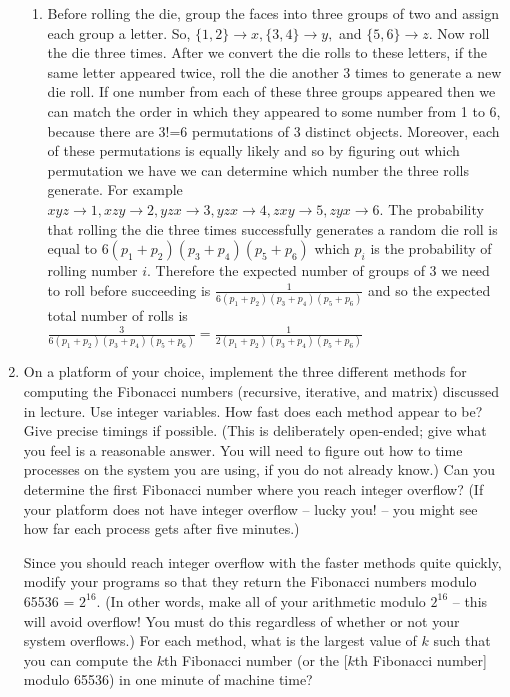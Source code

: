 \documentclass[11pt]{article}
\begin{document}
\begin{enumerate}
\begin{enumerate}
	\item Before rolling the die, group the faces into three groups of two and assign each group a letter.  So, $\{1,2\} \to x, \{3,4\}\to y,$ and $\{5,6\}\to z$.  Now roll the die three times.  After we convert the die rolls to these letters, if the same letter appeared twice, roll the die another 3 times to generate a new die roll.  If one number from each of these three groups appeared then we can match the order in which they appeared to some number from 1 to 6, because there are 3!=6 permutations of 3 distinct objects.  Moreover, each of these permutations is equally likely and so by figuring out which permutation we have we can determine which number the three rolls generate.  For example $xyz \to 1, xzy \to 2, yzx \to 3, yzx \to 4, zxy \to 5, zyx \to 6$.  The probability that rolling the die three times successfully generates a random die roll is equal to $6(p_1 + p_2)(p_3 + p_4)(p_5 + p_6)$ which $p_i$ is the probability of rolling number $i$.  Therefore the expected number of groups of 3 we need to roll before succeeding is $\frac{1}{6(p_1 + p_2)(p_3 + p_4)(p_5 + p_6)}$ and so the expected total number of rolls is $\frac{3}{6(p_1 + p_2)(p_3 + p_4)(p_5 + p_6)} = \frac{1}{2(p_1 + p_2)(p_3 + p_4)(p_5 + p_6)}$
\end{enumerate}

\item On a platform of your choice, implement the three different
methods for computing the Fibonacci numbers (recursive, iterative, and
matrix) discussed in lecture.  Use integer variables.  How fast does
each method appear to be?  Give precise timings if possible.  (This is
deliberately open-ended; give what you feel is a reasonable answer.
You will need to figure out how to time processes on the system you
are using, if you do not already know.)  Can you determine the first
Fibonacci number where you reach integer overflow?  (If your platform
does not have integer overflow -- lucky you! -- you might see how far
each process gets after five minutes.)

Since you should reach integer overflow with the faster methods quite
quickly, modify your programs so that they return the Fibonacci
numbers modulo 65536 = $2^{16}$. (In other words, make all of your
arithmetic modulo $2^{16}$ -- this will avoid overflow!  You must do
this regardless of whether or not your system overflows.)  For each
method, what is the largest value of $k$ such that you can compute the $k$th Fibonacci number 
(or the [$k$th Fibonacci number] modulo 65536) in one minute of machine time?  


\end{enumerate}
\end{document}
